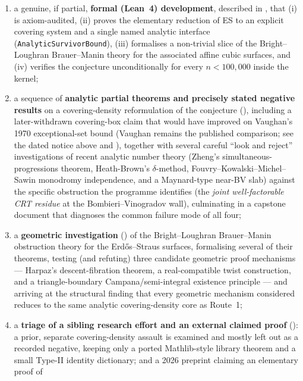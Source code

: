 \documentclass[11pt]{article}
\theoremstyle{plain}
\theoremstyle{definition}
\theoremstyle{remark}
\newcommand{\lean}[1]{\texttt{#1}}
\renewcommand{\_}{\textunderscore\allowbreak}
\begin{document}
\begin{enumerate}[leftmargin=1.6em]
  \item a genuine, if partial, \textbf{formal (Lean~4) development}, described in
        , that (i) is axiom-audited, (ii) proves the elementary reduction of ES to
        an explicit covering system and a single named analytic interface
        (\lean{AnalyticSurvivorBound}), (iii) formalises a non-trivial slice of the
        Bright--Loughran Brauer--Manin theory for the associated affine cubic surfaces, and
        (iv) verifies the conjecture unconditionally for every $n<100{,}000$ inside the kernel;
  \item a sequence of \textbf{analytic partial theorems and precisely stated negative results}
        on a covering-density reformulation of the conjecture (), including a
        later-withdrawn covering-box claim that would have improved on Vaughan's 1970
        exceptional-set bound (Vaughan remains the published comparison; see the dated notice
        above and ), together with
        several careful ``look and reject'' investigations of recent analytic number theory
        (Zheng's simultaneous-progressions theorem, Heath-Brown's $\delta$-method,
        Fouvry--Kowalski--Michel--Sawin monodromy independence, and a Maynard-type near-BV slab)
        against the specific obstruction the programme identifies (the \emph{joint
        well-factorable CRT residue} at the Bombieri--Vinogradov wall), culminating in a
        capstone document that diagnoses the common failure mode of all four;
  \item a \textbf{geometric investigation} () of the Bright--Loughran
        Brauer--Manin obstruction theory for the Erd\H{o}s--Straus surfaces, formalising several
        of their theorems, testing (and refuting) three candidate geometric proof mechanisms —
        Harpaz's descent-fibration theorem, a real-compatible twist construction, and a
        triangle-boundary Campana/semi-integral existence principle — and arriving at the
        structural finding that every geometric mechanism considered reduces to the same
        analytic covering-density core as Route~1;
  \item a \textbf{triage of a sibling research effort and an external claimed proof}
        (): a prior, separate covering-density assault is examined and mostly
        left out as a recorded negative, keeping only a ported Mathlib-style library theorem and
        a small Type-II identity dictionary; and a 2026 preprint claiming an elementary proof of

\end{enumerate}
\end{document}
